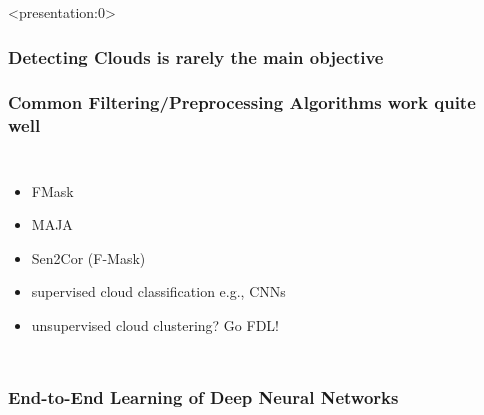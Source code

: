 \documentclass[%
  aspectratio=169,
  9pt,
ngerman,
  light,
  mathserif,
  professionalfont,
  affiliationintitlepagehead,
  titlegraphic,
   affiliation,
   navigationbar,
  progressbar,
]{beamer}
\begin{document}
{

\begin{frame}<presentation:0>

\frametitle{Detecting Clouds is rarely the main objective}
\LARGE
\centering\figcloudfilteringpipeline

\end{frame}

%


%
%

%
%
%
%
%

\begin{frame}
	\frametitle{Common Filtering/Preprocessing Algorithms work quite well}
	
	\begin{columns}
		\begin{itemize}
			\item FMask
			\item MAJA
			\item Sen2Cor (F-Mask)
			\item supervised cloud classification e.g., CNNs
			\item unsupervised cloud clustering? {\small Go FDL!}
		\end{itemize}
	
	\end{columns}
\end{frame}

\begin{frame}
\frametitle{End-to-End Learning of Deep Neural Networks}
\centering

\end{frame}}
\end{document}
